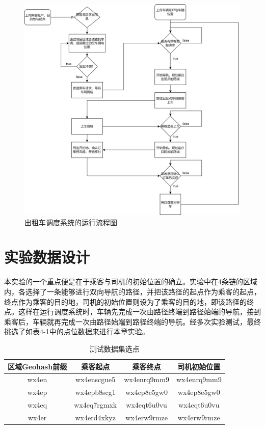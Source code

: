 \begin{figure}
	\centering
	\includegraphics[width=\textwidth]{figures/出租车调度系统的运行流程图.png}
	\caption{出租车调度系统的运行流程图}
	\label{fig:出租车调度系统的运行流程图}
\end{figure}

\section{实验数据设计}

本实验的一个重点便是在于乘客与司机的初始位置的确立。实验中在4条链的区域内，各选择了一条能够进行双向导航的路径，并把该路径的起点作为乘客的起点，终点作为乘客的目的地，司机的初始位置则设为了乘客的目的地，即该路径的终点。这样在运行调度系统时，车辆先完成一次由路径终端到路径始端的导航，接到乘客后，车辆就再完成一次由路径始端到路径终端的导航。经多次实验测试，最终挑选了如表4-1中的点位数据来进行本章实验。

\begin{table}[htbp]
    \linespread{1.5}
    \centering
    \caption{测试数据集选点}\label{测试数据集选点}
    \begin{tabular}{c|c|c|c} \toprule
        区域Geohash前缀 & 乘客起点        & 乘客终点        & 司机初始位置      \\\hline
        wx4en       & wx4enscgue5 & wx4enrq9mm9 & wx4enrq9mm9 \\
        wx4ep       & wx4epb8scg1 & wx4ep8e5gw0 & wx4ep8e5gw0 \\
        wx4eq       & wx4eq7rgmxk & wx4eqt6u0vu & wx4eqt6u0vu \\
        wx4er       & wx4erd4xkyz & wx4erw9rmze & wx4erw9rmze \\
        \bottomrule
    \end{tabular}
\end{table}

